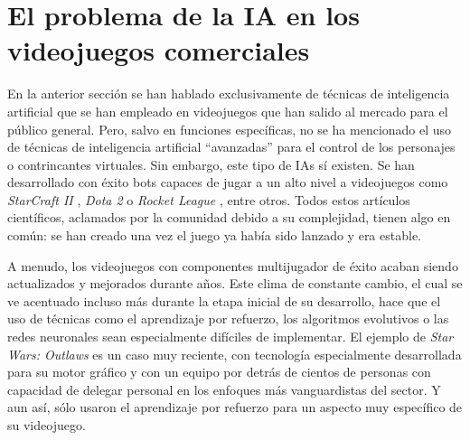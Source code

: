 
\section{El problema de la IA en los videojuegos comerciales} \label{sec:problema_ia_videojuegos}

En la anterior sección se han hablado exclusivamente de técnicas de inteligencia artificial que se han empleado en videojuegos que han salido al mercado para el público general. Pero, salvo en funciones específicas, no se ha mencionado el uso de técnicas de inteligencia artificial ``avanzadas'' para el control de los personajes o contrincantes virtuales. Sin embargo, este tipo de IAs sí existen. Se han desarrollado con éxito bots capaces de jugar a un alto nivel a videojuegos como \textit{StarCraft II} \cite{vinyals_grandmaster_2019}, \textit{Dota 2} \cite{openai_dota_2019} o \textit{Rocket League} \cite{moschopoulos_lucy-skg_2023}, entre otros. Todos estos artículos científicos, aclamados por la comunidad debido a su complejidad, tienen algo en común: se han creado una vez el juego ya había sido lanzado y era estable.

A menudo, los videojuegos con componentes multijugador de éxito acaban siendo actualizados y mejorados durante años. Este clima de constante cambio, el cual se ve acentuado incluso más durante la etapa inicial de su desarrollo, hace que el uso de técnicas como el aprendizaje por refuerzo, los algoritmos evolutivos o las redes neuronales sean especialmente difíciles de implementar. El ejemplo de \textit{Star Wars: Outlaws} es un caso muy reciente, con tecnología especialmente desarrollada para su motor gráfico y con un equipo por detrás de cientos de personas con capacidad de delegar personal en los enfoques más vanguardistas del sector. Y aun así, sólo usaron el aprendizaje por refuerzo para un aspecto muy específico de su videojuego.

